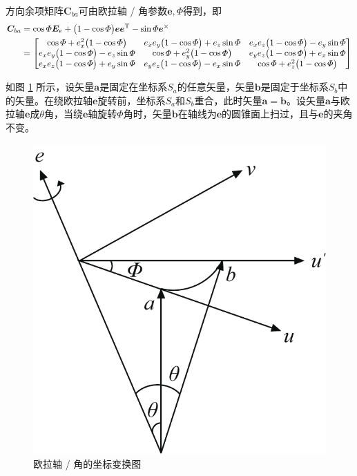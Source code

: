 方向余项矩阵$\bm{C}_{ba}$可由欧拉轴 / 角参数$\bm{e}, \varPhi$得到，即
\begin{align}
	\bm{C}_{ba} 
	& = \cos \varPhi \bm{E}_e + \big( 1 - \cos \varPhi \big) \bm{e} \bm{e}^{\text{T}} - \sin \varPhi \bm{e}^{\times} \notag \\
	& = 
	\begin{bmatrix}
		\cos \varPhi + e_x^2 \big( 1 - \cos \varPhi \big) & e_x e_y \big( 1 - \cos \varPhi \big) + e_z \sin \varPhi & e_x e_z \big( 1 - \cos \varPhi \big) - e_y \sin \varPhi \\
		e_x e_y \big( 1 - \cos \varPhi \big) - e_z \sin \varPhi & \cos \varPhi + e_y^2 \big( 1 - \cos \varPhi \big) & e_y e_z \big(1 - \cos \varPhi \big) + e_x \sin \varPhi \\
		e_x e_z \big( 1 - \cos \varPhi \big) + e_y \sin \varPhi & e_y e_z \big( 1- \cos \varPhi \big) - e_x \sin \varPhi & \cos \varPhi + e_z^2 \big( 1- \cos \varPhi \big)
	\end{bmatrix}
\end{align}
\clearpage
\vspace*{-2.5em}

\proof 如图 \ref{欧拉轴角} 所示，设矢量$\bm{a}$是固定在坐标系$S_a$的任意矢量，矢量$\bm{b}$是固定于坐标系$S_b$中的矢量。在绕欧拉轴$\bm{e}$旋转前，坐标系$S_a$和$S_b$重合，此时矢量$\bm{a} = \bm{b}$。设矢量$\bm{a}$与欧拉轴$\bm{e}$成$\theta$角，当绕$\bm{e}$轴旋转$\varPhi$角时，矢量$\bm{b}$在轴线为$\bm{e}$的圆锥面上扫过，且与$\bm{e}$的夹角不变。

\begin{figure}[!htb]
	\centering
	\includegraphics[width=0.28\linewidth]{pic/欧拉轴角}
	\caption{欧拉轴 / 角的坐标变换图}
	\label{欧拉轴角}
\end{figure}

